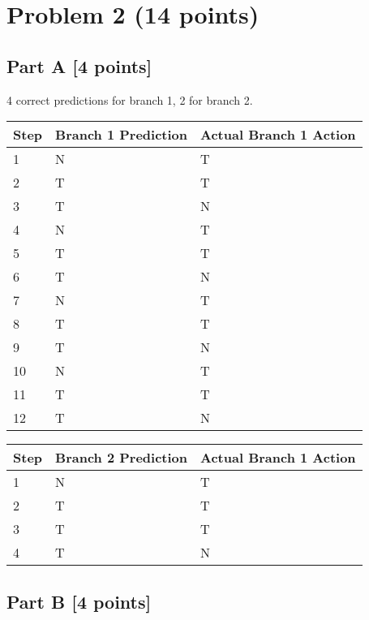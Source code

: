 \documentclass[11pt,leqno]{article}
\begin{document}
\section*{Problem 2 (14 points)}

\subsection*{Part A [4 points]}

4 correct predictions for branch 1, 2 for branch 2.

\begin{tabular}{|l | l | l |}
  \hline
  Step  & Branch 1 Prediction   & Actual Branch 1 Action\\
  \hline
  1     & N                     & T\\
  \hline
  2     & T                     & T\\
  \hline
  3     & T                     & N\\
  \hline
  4     & N                     & T\\
  \hline
  5     & T                     & T\\
  \hline
  6     & T                     & N\\
  \hline
  7     & N                     & T\\
  \hline
  8     & T                     & T\\
  \hline
  9     & T                     & N\\
  \hline
  10     & N                     & T\\
  \hline
  11     & T                     & T\\
  \hline
  12     & T                     & N\\
  \hline
\end{tabular}

\begin{tabular}{|l | l | l |}
  \hline
  Step  & Branch 2 Prediction   & Actual Branch 1 Action\\
  \hline
  1     & N                     & T\\
  \hline
  2     & T                     & T\\
  \hline
  3     & T                     & T\\
  \hline
  4     & T                     & N\\
  \hline
\end{tabular}

\subsection*{Part B [4 points]}
\end{document}

